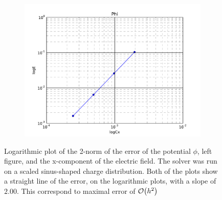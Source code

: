 \begin{figure}
    \centering
    \begin{subfigure}[b]{0.49\textwidth}
        \includegraphics[width = \textwidth]{figures/verification/errorScaling/errorloglog}
    \end{subfigure}
    \begin{subfigure}[b]{0.49\textwidth}
    \end{subfigure}
    \caption{Logarithmic plot of the 2-norm of the error of the potential \(\phi\), left figure, and the
    x-component of the electric field. The solver was run on a scaled sinus-shaped charge distribution.
    Both of the plots show a straight line of the error, on the logarithmic plots, with a slope
    of \(2.00\). This correspond to maximal error of \(\order{h^2}\)}
    \label{fig:errorScaling}
\end{figure}
